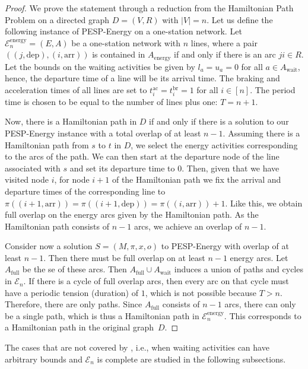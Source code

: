 \documentclass[11pt,a4paper]{article}
\newcommand{\arr}{\mathrm{arr}}
\newcommand{\dep}{\mathrm{dep}}
\newcommand{\wait}{\mathrm{wait}}
\newcommand{\energy}{\mathrm{energy}}
\newcommand{\energyact}{M}               %
\newcommand{\possenergyact}{A_{\energy}} %
\newcommand{\ac}{\mathrm{ac}}
\newcommand{\br}{\mathrm{br}}
\newcommand{\pespenergy}{PESP-Energy\xspace}
\newcommand{\osn}{one-station network\xspace}
\newcommand{\cE}{\mathcal{E}}
\theoremstyle{definition}
\theoremstyle{remark}
\begin{document}
\begin{proof}
	We prove the statement through a reduction from the Hamiltonian Path Problem on a directed graph $D=(V, R)$ with $|V| = n$. Let us define the following instance of \pespenergy on a \osn. Let $\cE_n^{\energy} =(E, A)$ be a \osn with $n$ lines, where a pair $((j, \dep),(i, \arr))$ is contained in $\possenergyact$ if and only if there is an arc $ji \in R$. Let the bounds on the waiting activities be given by $l_a=u_a=0$ for all $a \in A_{\wait}$, hence, the departure time of a line will be its arrival time. The braking and acceleration times of all lines are set to $t^{\ac}_i = t^{\br}_i=1$ for all $i \in [n]$. The period time is chosen to be equal to the number of lines plus one: $T = n+1$.
    
    Now, there is a Hamiltonian path in $D$ if and only if there is a solution to our \pespenergy instance with a total overlap of at least $n-1$. Assuming there is a Hamiltonian path from $s$ to $t$ in $D$, we select the energy activities corresponding to the arcs of the path. We can then start at the departure node of the line associated with $s$ and set its departure time to $0$. Then, given that we have visited node $i$, for node $i+1$ of the Hamiltonian path we fix the arrival and departure times of the corresponding line to $\pi((i+1, \arr))=\pi((i+1, \dep))= \pi((i, \arr))+1$. Like this, we obtain full overlap on the energy arcs given by the Hamiltonian path. As the Hamiltonian path consists of $n-1$ arcs, we achieve an overlap of $n-1$. 
    
    Consider now a solution $S=(\energyact, \pi, x, o)$ to \pespenergy with overlap of at least $n-1$. Then there must be full overlap on at least $n-1$ energy arcs. Let $A_{\text{full}}$ be the se of these arcs. Then $A_{\text{full}} \cup A_{\wait}$ induces a union of paths and cycles in $\cE_n$. If there is a cycle of full overlap arcs, then every arc on that cycle must have a periodic tension (duration) of $1$, which is not possible because $T > n$. Therefore, there are only paths. Since $A_{\text{full}}$ consists of $n-1$ arcs, there can only be a single path, which is thus a Hamiltonian path in $\cE_n^{\energy}$. This corresponds to a Hamiltonian path in the original graph~$D$.
\end{proof}

The cases that are not covered by , i.e., when waiting activities can have arbitrary bounds and $\cE_n$ is complete are studied in the following subsections.
\end{document}
